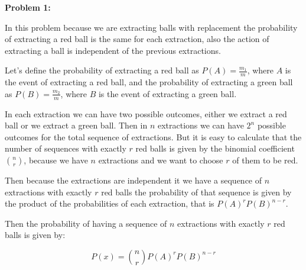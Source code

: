 \textbf{Problem 1:}

\singlespacing

In this problem because we are extracting balls with replacement
the probability of extracting a red ball is the same for each extraction, also
the action of extracting a ball is independent of the previous extractions.

\singlespacing

Let's define the probability of extracting a red ball as $P(A) = \frac{m_1}{m}$, where
$A$ is the event of extracting a red ball, and the probability of extracting a green ball as $P(B) = \frac{m_2}{m}$, where
$B$ is the event of extracting a green ball.

\singlespacing

In each extraction we can have two possible outcomes, either we extract a red ball
or we extract a green ball. Then in $n$ extractions we can have $2^n$ possible outcomes for
the total sequence of extractions. But it is easy to calculate that the number of sequences
with exactly $r$ red balls is given by the binomial coefficient $\binom{n}{r}$, because
we have $n$ extractions and we want to choose $r$ of them to be red.

\singlespacing

Then because the extractions are independent it we have a sequence of $n$ extractions
with exactly $r$ red balls the probability of that sequence is given by the product of the
probabilities of each extraction, that is $P(A)^r P(B)^{n-r}$.

\singlespacing

Then the probability of having a sequence of $n$ extractions with exactly $r$ red balls is given by:

\singlespacing

\begin{equation}
    P(x) = \binom{n}{r} P(A)^r P(B)^{n-r}
\end{equation}